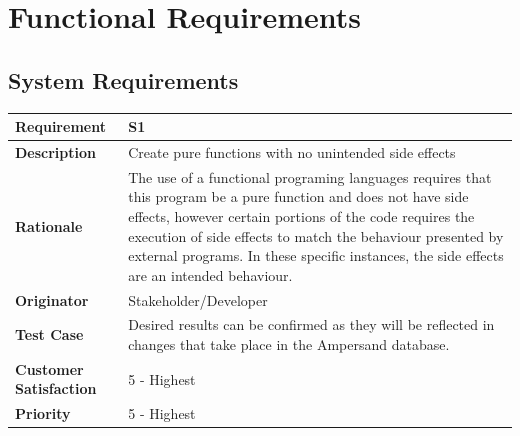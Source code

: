 \chapter{Functional Requirements}\label{sec:Functional}


\section{System Requirements}
{\setlength{\tabcolsep}{6pt} %
    \begin{tabularx}{\textwidth}{>{\bfseries}m{3cm}X}
        Requirement & S1 \\ 
        \midrule
        \endhead
        Description  & Create pure functions with no unintended side effects
        \\	Rationale & The use of a functional programing languages requires 
        that this program be a pure function and does not have side effects, 
        however certain portions of the code requires the execution of side 
        effects to match the behaviour presented by external programs. In these 
        specific instances, the side effects are an intended behaviour.
        \\	Originator & Stakeholder/Developer
        
        \\ Test Case & Desired results can be confirmed as they will be 
        reflected in changes that take place in the Ampersand database.
        \\	Customer Satisfaction & 5 - Highest 
        \\	Priority & 5 - Highest 
        \vspace{12pt}
    \end{tabularx}
}


